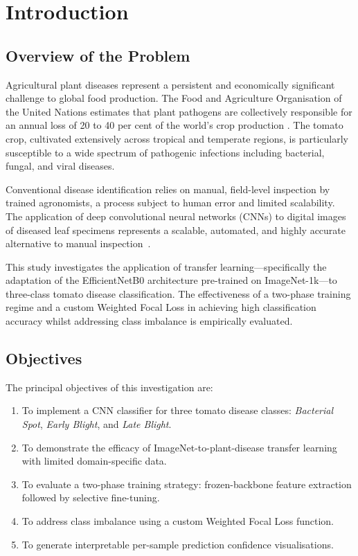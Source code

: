 \documentclass[12pt, a4paper, onecolumn]{IEEEtran}
\begin{document}
\section{Introduction}

\subsection{Overview of the Problem}

Agricultural plant diseases represent a persistent and economically significant challenge to global food
production. The Food and Agriculture Organisation of the United Nations estimates that plant pathogens
are collectively responsible for an annual loss of 20 to 40 per cent of the world's crop production
\cite{fao2021}. The tomato crop, cultivated extensively across tropical and temperate regions, is
particularly susceptible to a wide spectrum of pathogenic infections including bacterial, fungal, and
viral diseases.

Conventional disease identification relies on manual, field-level inspection by trained agronomists, a
process subject to human error and limited scalability. The application of deep convolutional neural
networks (CNNs) to digital images of diseased leaf specimens represents a scalable, automated, and
highly accurate alternative to manual inspection~\cite{hughes2015}.

This study investigates the application of transfer learning---specifically the adaptation of the
EfficientNetB0 architecture pre-trained on ImageNet-1k---to three-class tomato disease classification.
The effectiveness of a two-phase training regime and a custom Weighted Focal Loss in achieving high
classification accuracy whilst addressing class imbalance is empirically evaluated.

\subsection{Objectives}

The principal objectives of this investigation are:
\begin{enumerate}[leftmargin=1.6em, label=\arabic*)]
  \item To implement a CNN classifier for three tomato disease classes: \textit{Bacterial Spot},
        \textit{Early Blight}, and \textit{Late Blight}.
  \item To demonstrate the efficacy of ImageNet-to-plant-disease transfer learning with limited
        domain-specific data.
  \item To evaluate a two-phase training strategy: frozen-backbone feature extraction followed by
        selective fine-tuning.
  \item To address class imbalance using a custom Weighted Focal Loss function.
  \item To generate interpretable per-sample prediction confidence visualisations.
\end{enumerate}
\end{document}
